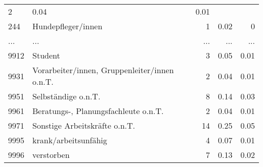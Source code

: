\begin{longtable}{lXrrr}
          \num{2} &
          \num[round-mode=places,round-precision=2]{0.04} &
          \num[round-mode=places,round-precision=2]{0.01} \\
        244 & \multicolumn{1}{X}{Hundepfleger/innen} & %
          \num{1} &
          \num[round-mode=places,round-precision=2]{0.02} &
          \num[round-mode=places,round-precision=2]{0} \\
       ... & ... & ... & ... & ... \\
        9912 & \multicolumn{1}{X}{Student} & %
          \num{3} &
          \num[round-mode=places,round-precision=2]{0.05} &
          \num[round-mode=places,round-precision=2]{0.01} \\

        9931 & \multicolumn{1}{X}{Vorarbeiter/innen, Gruppenleiter/innen o.n.T.} & %
          \num{2} &
          \num[round-mode=places,round-precision=2]{0.04} &
          \num[round-mode=places,round-precision=2]{0.01} \\

        9951 & \multicolumn{1}{X}{Selbständige o.n.T.} & %
          \num{8} &
          \num[round-mode=places,round-precision=2]{0.14} &
          \num[round-mode=places,round-precision=2]{0.03} \\

        9961 & \multicolumn{1}{X}{Beratungs-, Planungsfachleute o.n.T.} & %
          \num{2} &
          \num[round-mode=places,round-precision=2]{0.04} &
          \num[round-mode=places,round-precision=2]{0.01} \\

        9971 & \multicolumn{1}{X}{Sonstige Arbeitskräfte o.n.T.} & %
          \num{14} &
          \num[round-mode=places,round-precision=2]{0.25} &
          \num[round-mode=places,round-precision=2]{0.05} \\

        9995 & \multicolumn{1}{X}{krank/arbeitsunfähig} & %
          \num{4} &
          \num[round-mode=places,round-precision=2]{0.07} &
          \num[round-mode=places,round-precision=2]{0.01} \\

        9996 & \multicolumn{1}{X}{verstorben} & %
          \num{7} &
          \num[round-mode=places,round-precision=2]{0.13} &
          \num[round-mode=places,round-precision=2]{0.02} \\


\end{longtable}
